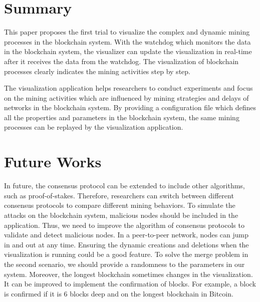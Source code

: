 \section{Summary}

This paper proposes the first trial to visualize the complex and dynamic mining processes in the blockchain system. With the watchdog which monitors the data in the blockchain system, the visualizer can update the visualization in real-time after it receives the data from the watchdog. The visualization of blockchain processes clearly indicates the mining activities step by step. 

The visualization application helps researchers to conduct experiments and focus on the mining activities which are influenced by mining strategies and delays of networks in the blockchain system. By providing a configuration file which defines all the properties and parameters in the blockchain system, the same mining processes can be replayed by the visualization application.

\section{Future Works}

In future, the consensus protocol can be extended to include other algorithms, such as proof-of-stakes. Therefore, researchers can switch between different consensus protocols to compare different mining behaviors. To simulate the attacks on the blockchain system, malicious nodes should be included in the application. Thus, we need to improve the algorithm of consensus protocols to validate and detect malicious nodes. In a peer-to-peer network, nodes can jump in and out at any time. Ensuring the dynamic creations and deletions when the visualization is running could be a good feature. To solve the merge problem in the second scenario, we should provide a randomness to the parameters in our system. Moreover, the longest blockchain sometimes changes in the visualization. It can be improved to implement the confirmation of blocks. For example, a block is confirmed if it is 6 blocks deep and on the longest blockchain in Bitcoin.
